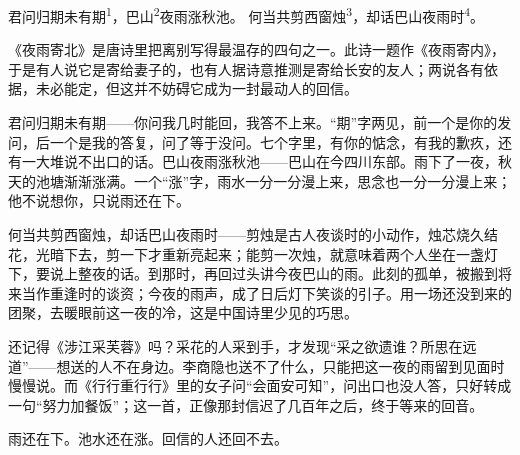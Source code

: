 
\begin{poem}
君问归期未有期\textsuperscript{1}，巴山\textsuperscript{2}夜雨涨秋池。
何当共剪西窗烛\textsuperscript{3}，却话巴山夜雨时\textsuperscript{4}。
\end{poem}

\begin{annotations}
\end{annotations}

\begin{appreciation}
《夜雨寄北》是唐诗里把离别写得最温存的四句之一。此诗一题作《夜雨寄内》，于是有人说它是寄给妻子的，也有人据诗意推测是寄给长安的友人；两说各有依据，未必能定，但这并不妨碍它成为一封最动人的回信。

君问归期未有期——你问我几时能回，我答不上来。“期”字两见，前一个是你的发问，后一个是我的答复，问了等于没问。七个字里，有你的惦念，有我的歉疚，还有一大堆说不出口的话。巴山夜雨涨秋池——巴山在今四川东部。雨下了一夜，秋天的池塘渐渐涨满。一个“涨”字，雨水一分一分漫上来，思念也一分一分漫上来；他不说想你，只说雨还在下。

何当共剪西窗烛，却话巴山夜雨时——剪烛是古人夜谈时的小动作，烛芯烧久结花，光暗下去，剪一下才重新亮起来；能剪一次烛，就意味着两个人坐在一盏灯下，要说上整夜的话。到那时，再回过头讲今夜巴山的雨。此刻的孤单，被搬到将来当作重逢时的谈资；今夜的雨声，成了日后灯下笑谈的引子。用一场还没到来的团聚，去暖眼前这一夜的冷，这是中国诗里少见的巧思。

还记得《涉江采芙蓉》吗？采花的人采到手，才发现“采之欲遗谁？所思在远道”——想送的人不在身边。李商隐也送不了什么，只能把这一夜的雨留到见面时慢慢说。而《行行重行行》里的女子问“会面安可知”，问出口也没人答，只好转成一句“努力加餐饭”；这一首，正像那封信迟了几百年之后，终于等来的回音。

雨还在下。池水还在涨。回信的人还回不去。
\end{appreciation}
